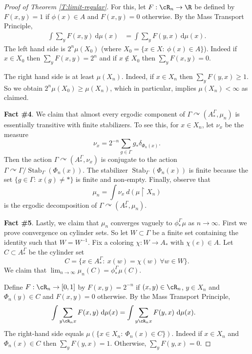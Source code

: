 \documentclass[12pt]{article}
\theoremstyle{plain}
\theoremstyle{definition}
\theoremstyle{remark}
\newcommand{\G}{\Gamma}
\renewcommand\d{\delta}
\newcommand\Stab{\operatorname{Stab}}
\def\cc{{\curvearrowright}}
\newcommand{\resto}{\upharpoonright}
\newcommand{\dee}{\textrm{d}}
\begin{document}
\begin{proof}[Proof of Theorem \ref{T:limit-regular}]
For this, let $F:\cR_n \to \R$ be defined by $F(x,y)=1$ if $\phi(x)\in A$ and $F(x,y)=0$ otherwise. By the Mass Transport Principle,
\begin{align*}
    \int \sum_y F(x,y)~\dee\mu(x) &= \int \sum_y F(y,x)~\dee\mu(x). 
\end{align*}
The left hand side is $2^n \mu(X_0)$ (where $X_0=\{x\in X:~\phi(x)\in A\}$). Indeed if $x\in X_0$ then $\sum_y F(x,y)=2^n$ and if $x\notin X_0$ then $\sum_y F(x,y)=0$.

The right hand side is at least $\mu(X_n)$. Indeed, if $x\in X_n$ then  $\sum_y F(y,x) \ge 1$. So we obtain $2^n \mu(X_0) \ge \mu(X_n)$, which in particular, implies $\mu(X_n)<\infty$ as claimed.

{\bf Fact \#4}. We claim that almost every ergodic component of $\G \cc (A_*^\G,\mu_n)$ is essentially transitive with finite stabilizers. To see this, for $x\in X_n$, let $\nu_x$ be the measure
$$\nu_x = 2^{-n} \sum_{g\in \G} g_*\d_{\Phi_n(x)}.$$
Then the action $\G \cc (A_*^\G,\nu_x)$ is conjugate to the action $\G \cc \G/\Stab_\G(\Phi_n(x))$. The stabilizer $\Stab_\G(\Phi_n(x))$ is finite because the set $\{g\in \G:~x(g)\ne *\}$ is finite and non-empty. Finally, observe that
$$\mu_n = \int \nu_x ~d(\mu \resto X_n)$$
is the ergodic decomposition of $\G \cc (A_*^\G,\mu_n)$. 



{\bf Fact \#5}. Lastly, we claim that $\mu_n$ converges vaguely to $\phi^\G_*\mu$ as $n\to\infty$. First we prove convergence on cylinder sets. So let $W \subset \G$ be a finite set containing the identity such that $W=W^{-1}$. Fix a coloring $\chi:W \to A_*$ with $\chi(e)\in A$. Let $C \subset A_*^\G$ be the cylinder set
$$C=\{x\in A_*^\G:~x(w)=\chi(w)~\forall w \in W\}.$$
We claim that $\lim_{n\to\infty} \mu_n(C) = \phi^\G_*\mu(C)$.

Define $F:\cR_n\to[0,1]$ by $F(x,y)=2^{-n}$ if $(x,y)\in \cR_n$, $y\in X_n$ and $\Phi_n(y)\in C$ and $F(x,y)=0$ otherwise. By the Mass Transport Principle,
\begin{align*}
    \int \sum_{y\cR_n x} F(x,y)~\dee\mu(x) &= \int \sum_{y\cR_n x} F(y,x)~\dee\mu(x). 
\end{align*}
The right-hand side equals $\mu(\{x\in X_n:~ \Phi_n(x)\in C\})$. Indeed if $x\in X_n$ and $\Phi_n(x)\in C$ then $\sum_y F(y,x)=1$. Otherwise, $\sum_y F(y,x)=0$.


\end{proof}
\end{document}
